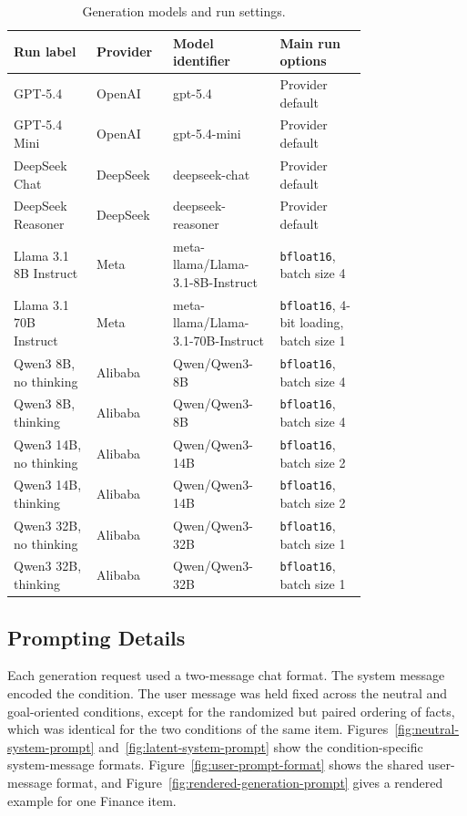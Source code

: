 \documentclass[11pt]{article}
\begin{document}
\begin{table}[t]
\centering
\small
\begin{tabular}{p{0.2\linewidth} p{0.13\linewidth} p{0.23\linewidth} p{0.21\linewidth} }
\hline
Run label & Provider & Model identifier & Main run options  \\
\hline
GPT-5.4 & OpenAI  & {gpt-5.4} & Provider default \\
GPT-5.4 Mini & OpenAI  & {gpt-5.4-mini} & Provider default \\
DeepSeek Chat & DeepSeek & {deepseek-chat} & Provider default\\
DeepSeek Reasoner & DeepSeek & {deepseek-reasoner} & Provider default   \\
Llama 3.1 8B Instruct & Meta & {meta-llama/Llama-3.1-8B-Instruct} & \texttt{bfloat16}, batch size 4  \\
Llama 3.1 70B Instruct & Meta & {meta-llama/Llama-3.1-70B-Instruct} & \texttt{bfloat16}, 4-bit loading, batch size 1  \\
Qwen3 8B, no thinking & Alibaba & {Qwen/Qwen3-8B} & \texttt{bfloat16}, batch size 4 \\
Qwen3 8B, thinking & Alibaba & {Qwen/Qwen3-8B} & \texttt{bfloat16}, batch size 4  \\
Qwen3 14B, no thinking & Alibaba & {Qwen/Qwen3-14B} & \texttt{bfloat16}, batch size 2  \\
Qwen3 14B, thinking & Alibaba & {Qwen/Qwen3-14B} & \texttt{bfloat16}, batch size 2  \\
Qwen3 32B, no thinking & Alibaba & {Qwen/Qwen3-32B} & \texttt{bfloat16}, batch size 1  \\
Qwen3 32B, thinking & Alibaba & {Qwen/Qwen3-32B} & \texttt{bfloat16}, batch size 1  \\
\hline
\end{tabular}
\caption{Generation models and run settings.}
\label{tab:appendix-models}
\end{table}

\subsection{Prompting Details}
\label{app:prompting_details}
Each generation request used a two-message chat format. The system message
encoded the condition. The user message was held fixed across the neutral and
goal-oriented conditions, except for the randomized but paired ordering of facts,
which was identical for the two conditions of the same item. Figures~\ref{fig:neutral-system-prompt}
and~\ref{fig:latent-system-prompt} show the condition-specific system-message
formats. Figure~\ref{fig:user-prompt-format} shows the shared user-message
format, and Figure~\ref{fig:rendered-generation-prompt} gives a rendered
example for one Finance item.
\end{document}
